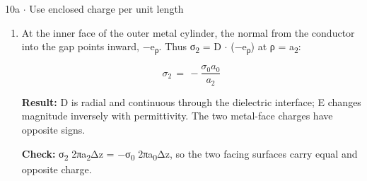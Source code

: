 \documentclass[11pt]{article}
\begin{document}
\begin{keepsection}
\begin{workedbox}{10a \ensuremath{\cdot} Use enclosed charge per unit length}
\begin{enumerate}
\begin{equation*}{E}(ρ)\, =\, \dfrac{σ_{0}{a}_{0}}{ε_{2}ρ}{e}_{ρ},\, \quad \, {a}_{1}\, <\, ρ\, <\, {a}_{2}\end{equation*}
\item {}
At the inner face of the outer metal cylinder, the normal from the conductor into the gap points inward, \ensuremath{-}e\textsubscript{ρ}. Thus σ\textsubscript{2} = D \ensuremath{\cdot} (\ensuremath{-}e\textsubscript{ρ}) at ρ = a\textsubscript{2}:

\begin{equation*}σ_{2}\, =\, -\dfrac{σ_{0}{a}_{0}}{{a}_{2}}\end{equation*}

\textbf{Result:} D is radial and continuous through the dielectric interface; E changes magnitude inversely with permittivity. The two metal-face charges have opposite signs.

\textbf{Check:} σ\textsubscript{2} 2πa\textsubscript{2}Δz = \ensuremath{-}σ\textsubscript{0} 2πa\textsubscript{0}Δz, so the two facing surfaces carry equal and opposite charge.


\end{enumerate}
\end{workedbox}
\end{keepsection}
\end{document}

